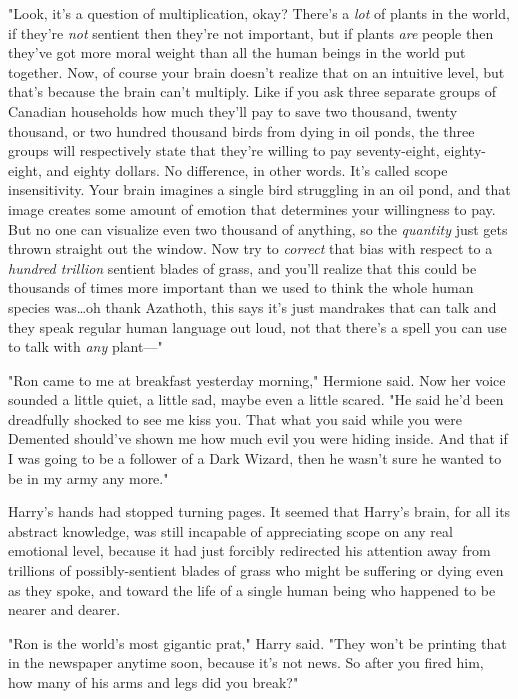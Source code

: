 "Look, it's a question of multiplication, okay? There's a \emph{lot} of plants
in the world, if they're \emph{not} sentient then they're not important, but if
plants \emph{are} people then they've got more moral weight than all the human
beings in the world put together. Now, of course your brain doesn't realize
that on an intuitive level, but that's because the brain can't multiply. Like
if you ask three separate groups of Canadian households how much they'll pay to
save two thousand, twenty thousand, or two hundred thousand birds from dying in
oil ponds, the three groups will respectively state that they're willing to pay
seventy-eight, eighty-eight, and eighty dollars. No difference, in other words.
It's called scope insensitivity. Your brain imagines a single bird struggling
in an oil pond, and that image creates some amount of emotion that determines
your willingness to pay. But no one can visualize even two thousand of
anything, so the \emph{quantity} just gets thrown straight out the window. Now
try to \emph{correct} that bias with respect to a \emph{hundred trillion}
sentient blades of grass, and you'll realize that this could be thousands of
times more important than we used to think the whole human species was…oh
thank Azathoth, this says it's just mandrakes that can talk and they speak
regular human language out loud, not that there's a spell you can use to talk
with \emph{any} plant---"

"Ron came to me at breakfast yesterday morning," Hermione said. Now her voice
sounded a little quiet, a little sad, maybe even a little scared. "He said he'd
been dreadfully shocked to see me kiss you. That what you said while you were
Demented should've shown me how much evil you were hiding inside. And that if I
was going to be a follower of a Dark Wizard, then he wasn't sure he wanted to
be in my army any more."

Harry's hands had stopped turning pages. It seemed that Harry's brain, for all
its abstract knowledge, was still incapable of appreciating scope on any real
emotional level, because it had just forcibly redirected his attention away
from trillions of possibly-sentient blades of grass who might be suffering or
dying even as they spoke, and toward the life of a single human being who
happened to be nearer and dearer.

"Ron is the world's most gigantic prat," Harry said. "They won't be printing
that in the newspaper anytime soon, because it's not news. So after you fired
him, how many of his arms and legs did you break?"

